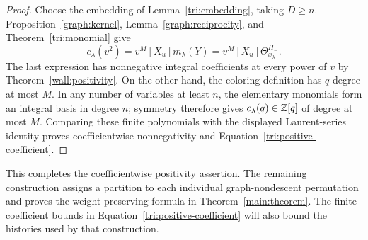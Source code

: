 \begin{proof}
Choose the embedding of Lemma~\ref{tri:embedding}, taking $D\geq n$.
Proposition~\ref{graph:kernel}, Lemma~\ref{graph:reciprocity}, and
Theorem~\ref{tri:monomial} give
\[
 c_\lambda(v^2)=v^M[X_u]m_\lambda(Y)
              =v^M[X_u]\Theta_{x_\lambda}^{H_-}.
\]
The last expression has nonnegative integral coefficients at every
power of $v$ by Theorem~\ref{wall:positivity}.
On the other hand, the coloring definition has $q$-degree at most
$M$.  In any number of variables at least $n$, the elementary
monomials form an integral basis in degree $n$; symmetry therefore
gives $c_\lambda(q)\in\mathbb Z[q]$ of degree at most $M$.
Comparing these finite polynomials with the displayed Laurent-series
identity proves coefficientwise nonnegativity and
Equation~\eqref{tri:positive-coefficient}.
\end{proof}

This completes the coefficientwise positivity assertion.  The remaining
construction assigns a partition to each individual graph-nondescent
permutation and proves the weight-preserving formula in
Theorem~\ref{main:theorem}.  The finite coefficient bounds in
Equation~\eqref{tri:positive-coefficient} will also bound the histories
used by that construction.
